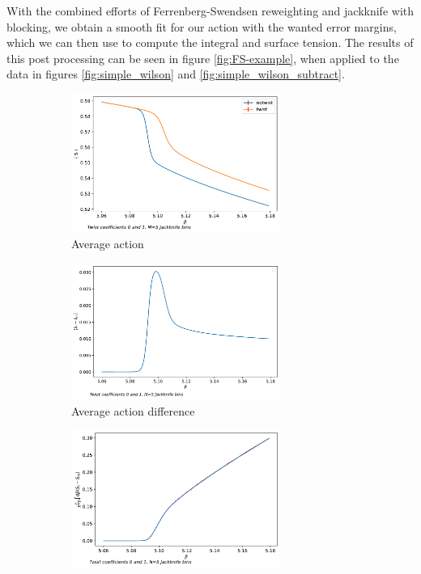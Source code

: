 \documentclass[english,twoside,openright]{UH_TCM_MSc}
\begin{document}
With the combined efforts of Ferrenberg-Swendsen reweighting and jackknife with blocking, we obtain a smooth fit for our action with the wanted error margins, which we can then use to compute the integral and surface tension. The results of this post processing can be seen in figure \ref{fig:FS-example}, when applied to the data in figures \ref{fig:simple_wilson} and \ref{fig:simple_wilson_subtract}.
\begin{figure}[htpb]
    \centering
    \begin{subfigure}[t]{\textwidth}
        \centering
        \includegraphics[width=0.75\textwidth]{final_plots/su3_fs_reweight/action.pdf}
        \caption{Average action}
        \label{fig:fs-reweight-action}
    \end{subfigure}
    \begin{subfigure}[t]{\textwidth}
        \centering  
        \includegraphics[width=0.75\textwidth]{final_plots/su3_fs_reweight/difference.pdf}
        \caption{Average action difference}
        \label{fig:fs-reweight-difference}
    \end{subfigure}
    \begin{subfigure}[t]{\textwidth}
        \centering
        \includegraphics[width=0.75\textwidth]{final_plots/su3_fs_reweight/integral.pdf}

\end{subfigure}
\end{figure}
\end{document}

